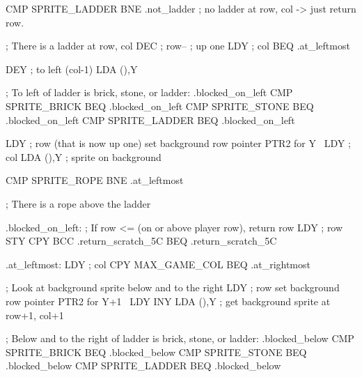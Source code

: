 \documentclass[10pt]{report}%
\begin{document}
    CMP     SPRITE_LADDER
    BNE     .not_ladder     ; no ladder at row, col -> just return row.

    ; There is a ladder at row, col
    DEC          ; row--     ; up one
    LDY          ; col
    BEQ     .at_leftmost

    DEY             ; to left (col-1)
    LDA     (),Y

    ; To left of ladder is brick, stone, or ladder: .blocked_on_left
    CMP     SPRITE_BRICK
    BEQ     .blocked_on_left
    CMP     SPRITE_STONE
    BEQ     .blocked_on_left
    CMP     SPRITE_LADDER
    BEQ     .blocked_on_left

    LDY          ; row (that is now up one)
    \LA{}set background row pointer \code{}PTR2\edoc{} for \code{}Y\edoc{}~{\nwtagstyle{}}\RA{}
    LDY          ; col
    LDA     (),Y    ; sprite on background

    CMP     SPRITE_ROPE
    BNE     .at_leftmost

    ; There is a rope above the ladder

.blocked_on_left:
    ; If row <=  (on or above player row), return row
    LDY          ; row
    STY     
    CPY     
    BCC     .return_scratch_5C
    BEQ     .return_scratch_5C

.at_leftmost:
    LDY          ; col
    CPY     MAX_GAME_COL
    BEQ     .at_rightmost

    ; Look at background sprite below and to the right
    LDY          ; row
    \LA{}set background row pointer \code{}PTR2\edoc{} for \code{}Y+1\edoc{}~{\nwtagstyle{}}\RA{}
    LDY     
    INY
    LDA     (),Y        ; get background sprite at row+1, col+1

    ; Below and to the right of ladder is brick, stone, or ladder: .blocked_below
    CMP     SPRITE_BRICK
    BEQ     .blocked_below
    CMP     SPRITE_STONE
    BEQ     .blocked_below
    CMP     SPRITE_LADDER
    BEQ     .blocked_below
\end{document}
